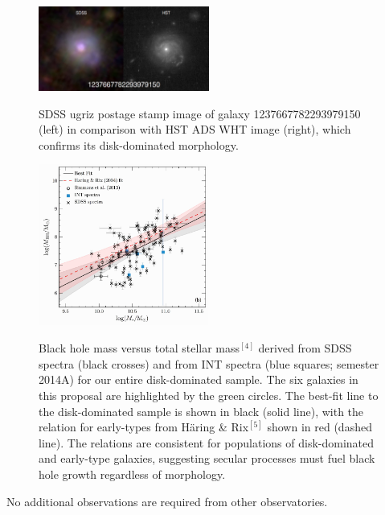 \documentclass[12pt]{article}
\begin{document}
\begin{figure} [h]
\includegraphics[width=0.5\textwidth]{fig3.png} \\
\caption{SDSS ugriz postage stamp image of galaxy 1237667782293979150 (left) in comparison with HST ADS WHT image (right), which confirms its disk-dominated morphology.}
\end{figure}

\begin{figure} [h]
\includegraphics[width=0.5\textwidth]{fig2_r.pdf} \\
\caption{Black hole mass versus total stellar mass$^{[4]}$ derived from SDSS spectra (black crosses) and from INT spectra (blue squares; semester 2014A) for our entire disk-dominated sample. The six galaxies in this proposal are highlighted by the green circles. The best-fit line to the disk-dominated sample is shown in black (solid line), with the relation for early-types from Häring \& Rix$^{[5]}$ shown in red (dashed line). The relations are consistent for populations of disk-dominated and early-type galaxies, suggesting secular processes must fuel black hole growth regardless of morphology.}
\end{figure}

\vspace{0.25em}


\vspace{0.25em}

\noindent No additional observations are required from other observatories.
\end{document}
